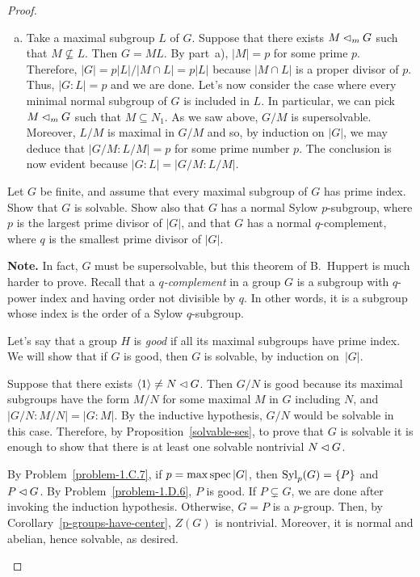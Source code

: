 \begin{proof}
\begin{solution}
\begin{enumerate}[a),font=\upshape]
    \item Take a maximal subgroup $L$ of $G$. Suppose that there exists $M\lhd_mG$ such that $M\not\subseteq L$. Then $G=ML$. By part~a), $|M|=p$ for some prime $p$. Therefore, $|G|=p|L|/|M\cap L|=p|L|$ because $|M\cap L|$ is a proper divisor of $p$. Thus, $|G:L|=p$ and we are done. Let's now consider the case where every minimal normal subgroup of $G$ is included in $L$. In particular, we can pick $M\lhd_mG$ such that $M\subseteq N_1$. As we saw above, $G/M$ is supersolvable. Moreover, $L/M$ is maximal in $G/M$ and so, by induction on $|G|$, we may deduce that $|G/M:L/M|=p$ for some prime number $p$. The conclusion is now evident because $|G:L|=|G/M:L/M|$.
\end{enumerate}
\end{solution}

\begin{probl}\label{problem-3.B.8}
    Let\/ $G$ be finite, and assume that every maximal subgroup of\/ $G$ has prime index. Show that\/ $G$ is solvable. Show also that\/ $G$ has a normal Sylow\/ $p$-subgroup, where\/ $p$ is the largest prime divisor of\/ $|G|$, and that\/ $G$ has a normal\/ $q$-complement, where\/ $q$ is the smallest prime divisor of\/ $|G|$.

    \textrm{\normalfont\textbf{Note.} In fact, $G$ must be supersolvable, but this theorem of B.~Huppert is much harder to prove. Recall that a \textsl{$q$-complement} in a group $G$ is a subgroup with $q$-power index and having order not divisible by $q$. In other words, it is a subgroup whose index is the order of a Sylow $q$-subgroup.}
\end{probl}

\begin{solution} Let's say that a group $H$ is \textsl{good\/} if all its maximal subgroups have prime index. We will show that if $G$ is good, then $G$ is solvable, by induction on~$|G|$.

Suppose that there exists $\langle1\rangle\ne N\lhd G$. Then $G/N$ is good because its maximal subgroups have the form $M/N$ for some maximal $M$ in $G$ including $N$, and $|G/N:M/N|=|G:M|$. By the inductive hypothesis, $G/N$ would be solvable in this case. Therefore, by Proposition~\ref{solvable-ses}, to prove that $G$ is solvable it is enough to show that there is at least one solvable nontrivial $N\lhd G$.

By Problem~\ref{problem-1.C.7}, if $p=\max\operatorname{spec}|G|$, then ${\rm Syl}_p(G)=\{P\}$ and $P\lhd G$. By Problem~\ref{problem-1.D.6}, $P$ is good. If $P\varsubsetneq G$, we are done after invoking the induction hypothesis. Otherwise, $G=P$ is a $p$-group. Then, by Corollary~\ref{p-groups-have-center}, $Z(G)$ is nontrivial. Moreover, it is normal and abelian, hence solvable, as desired.


\end{solution}
\end{proof}
